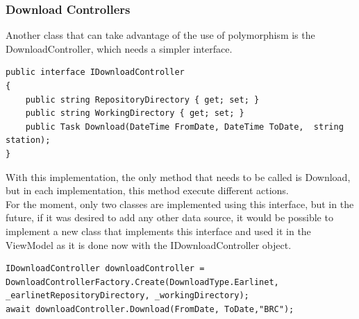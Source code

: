 \subsubsection{Download Controllers}
Another class that can take advantage of the use of polymorphism is the DownloadController, which needs a simpler interface.
\begin{lstlisting}
public interface IDownloadController
{
    public string RepositoryDirectory { get; set; }
    public string WorkingDirectory { get; set; }
    public Task Download(DateTime FromDate, DateTime ToDate,  string station);
}
\end{lstlisting}
With this implementation, the only method that needs to be called is Download, but in each implementation, this method execute different actions.\smallskip\\
For the moment, only two classes are implemented using this interface, but in the future, if it was desired to add any other data source, it would be possible to implement a new class that implements this interface and used it in the ViewModel as it is done now with the IDownloadController object.\smallskip
\begin{lstlisting}
IDownloadController downloadController = DownloadControllerFactory.Create(DownloadType.Earlinet, _earlinetRepositoryDirectory, _workingDirectory);
await downloadController.Download(FromDate, ToDate,"BRC");
\end{lstlisting}
